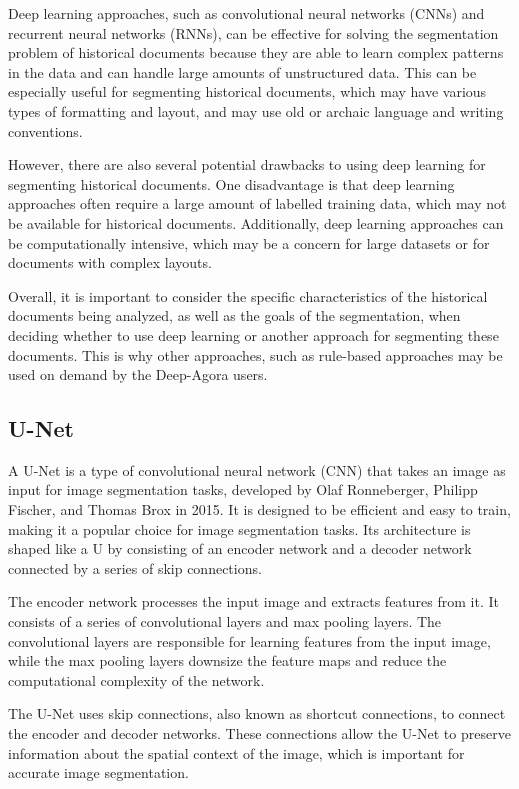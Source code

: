 \documentclass{polytech/polytech}
\numberwithin{figure}{chapter}
\begin{document}
Deep learning approaches, such as convolutional neural networks (CNNs) and recurrent neural networks (RNNs), can be effective for solving the segmentation problem of historical documents because they are able to learn complex patterns in the data and can handle large amounts of unstructured data.
This can be especially useful for segmenting historical documents, which may have various types of formatting and layout, and may use old or archaic language and writing conventions.

However, there are also several potential drawbacks to using deep learning for segmenting historical documents.
One disadvantage is that deep learning approaches often require a large amount of labelled training data, which may not be available for historical documents.
Additionally, deep learning approaches can be computationally intensive, which may be a concern for large datasets or for documents with complex layouts.

Overall, it is important to consider the specific characteristics of the historical documents being analyzed, as well as the goals of the segmentation, when deciding whether to use deep learning or another approach for segmenting these documents.
This is why other approaches, such as rule-based approaches may be used on demand by the Deep-Agora users.


\subsection{U-Net}

A U-Net is a type of convolutional neural network (CNN) that takes an image as input for image segmentation tasks, developed by Olaf Ronneberger, Philipp Fischer, and Thomas Brox in 2015.
It is designed to be efficient and easy to train, making it a popular choice for image segmentation tasks.
Its architecture is shaped like a U by consisting of an encoder network and a decoder network connected by a series of skip connections.

The encoder network processes the input image and extracts features from it.
It consists of a series of convolutional layers and max pooling layers.
The convolutional layers are responsible for learning features from the input image, while the max pooling layers downsize the feature maps and reduce the computational complexity of the network.

The U-Net uses skip connections, also known as shortcut connections, to connect the encoder and decoder networks.
These connections allow the U-Net to preserve information about the spatial context of the image, which is important for accurate image segmentation.
\end{document}
